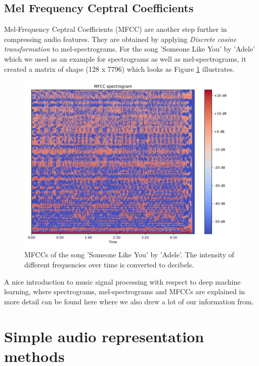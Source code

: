 \subsection{Mel Frequency Ceptral Coefficients}\label{ssec:mfcc_intro}
Mel-Frequency Ceptral Coefficients (MFCC) are another step further in compressing audio features. They are obtained by applying \textit{Discrete cosine transformation} to mel-spectrograms. For the song 'Someone Like You' by 'Adele' which we used as an example for spectrograms as well as mel-spectrograms, it created a matrix of shape (128 x 7796) which looks as Figure \ref{fig:ilustrative_mfccs} illustrates. 

\begin{figure}[h!]
    \centering
	\includegraphics[width=140mm]{./img/mfccs.png}
	\caption{MFCCs of the song 'Someone Like You' by 'Adele'. The intensity of different frequencies over time is converted to decibels.}
	\label{fig:ilustrative_mfccs}
\end{figure}

A nice introduction to music signal processing with respect to deep machine learning, where spectrograms, mel-spectrograms and MFCCs are explained in more detail can be found here \cite{Schluter2017} where we also drew a lot of our information from.

\section{Simple audio representation methods}\label{sec:audio_machine_learning}

